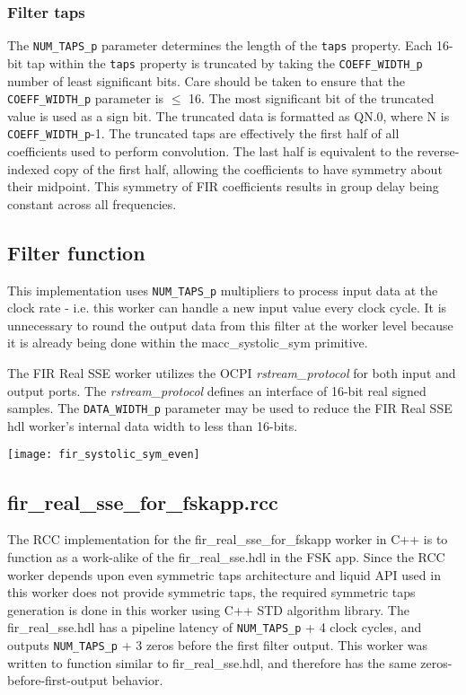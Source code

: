 \subsubsection*{Filter taps}
\begin{flushleft}
	The \verb+NUM_TAPS_p+ parameter determines the length of the \verb+taps+ property.  Each 16-bit tap within the \verb+taps+ property is truncated by taking the \verb+COEFF_WIDTH_p+ number of least significant bits. Care should be taken to ensure that the \verb+COEFF_WIDTH_p+ parameter is $\le$ 16. The most significant bit of the truncated value is used as a sign bit. The truncated data is formatted as QN.0, where N is \verb+COEFF_WIDTH_p+-1. The truncated taps are effectively the first half of all coefficients used to perform convolution. The last half is equivalent to the reverse-indexed copy of the first half, allowing the coefficients to have symmetry about their midpoint. This symmetry of FIR coefficients results in group delay being constant across all frequencies.
\medskip
\end{flushleft}

\subsection*{Filter function}
\begin{flushleft}
	This implementation uses \verb+NUM_TAPS_p+ multipliers to process input data at the clock rate - i.e. this worker can handle a new input value every clock cycle. It is unnecessary to round the output data from this filter at the worker level because it is already being done within the macc\_systolic\_sym primitive.\medskip

	The FIR Real SSE worker utilizes the OCPI \textit{rstream\_protocol} for both input and output ports. The \textit{rstream\_protocol} defines an interface of 16-bit real signed samples. The \verb+DATA_WIDTH_p+ parameter may be used to reduce the FIR Real SSE hdl worker's internal data width to less than 16-bits.
\end{flushleft}
{\centering\captionsetup{type=figure}\texttt{[image: fir\_systolic\_sym\_even]}\par{}\label{fig:circuit}}

\subsection*{fir\_real\_sse\_for\_fskapp.rcc}
The RCC implementation for the fir\_real\_sse\_for\_fskapp worker in C++ is to function as a work-alike of the fir\_real\_sse.hdl in the FSK app. 
Since the RCC worker depends upon even symmetric taps architecture and liquid API used in this worker does not provide symmetric taps,
the required symmetric taps generation is done in this worker using C++ STD algorithm library. 
The fir\_real\_sse.hdl has a pipeline latency of \verb+NUM_TAPS_p+ + 4 clock cycles, and outputs \verb+NUM_TAPS_p+ + 3 zeros before the first filter output. This worker was written to function similar to fir\_real\_sse.hdl, and therefore has the same zeros-before-first-output behavior.

